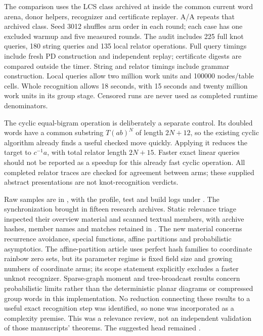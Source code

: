 The comparison uses the LCS class archived at  inside
the common current word arena, donor helpers, recognizer and certificate
replayer. A/A repeats that archived class. Seed 3012 shuffles arm order
in each round; each case has one excluded warmup and five measured rounds.
The audit includes 225 full knot queries, 180 string queries and 135
local relator operations. Full query timings include fresh PD construction
and independent replay; certificate digests are compared outside the
timer. String and relator timings include grammar construction. Local
queries allow two million work units and 100000 nodes/table cells.
Whole recognition allows 18 seconds, with 15 seconds and twenty million
work units in its group stage. Censored runs are never used as completed
runtime denominators.

The cyclic equal-bigram operation is deliberately a separate control.
Its doubled words have a common substring $T(ab)^N$ of length $2N+12$,
so the existing cyclic algorithm already finds a useful checked move
quickly. Applying it reduces the target to $c^{-1}a$, with total relator
length $2N+15$. Faster exact linear queries should not be reported as a
speedup for this already fast cyclic operation. All completed relator
traces are checked for agreement between arms; these supplied abstract
presentations are not knot-recognition verdicts.

Raw samples are in , with the
profile, test and build logs under .
The synchronization brought in fifteen research archives. Static relevance
triage inspected their overview material and scanned textual members,
with archive hashes, member names and matches retained in
. The new material concerns
recurrence avoidance, special functions, affine partitions and probabilistic
asymptotics. The affine-partition article uses perfect hash families to
coordinate rainbow zero sets, but its parameter regime is fixed field
size and growing numbers of coordinate arms; its scope statement explicitly
excludes a faster unknot recognizer. Sparse-graph moment and tree-broadcast
results concern probabilistic limits rather than the deterministic planar
diagrams or compressed group words in this implementation. No reduction
connecting these results to a useful exact recognition step was identified,
so none was incorporated as a complexity premise. This was a relevance
review, not an independent validation of those manuscripts' theorems.
The suggested  head remained .
